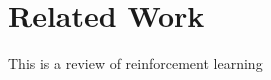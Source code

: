 \setlength{\parindent}{0pt}
\chapter{Related Work}
\label{chap:related_work}
This is a review of reinforcement learning~\cite{kaelbling1996reinforcement}
\lipsum[7]